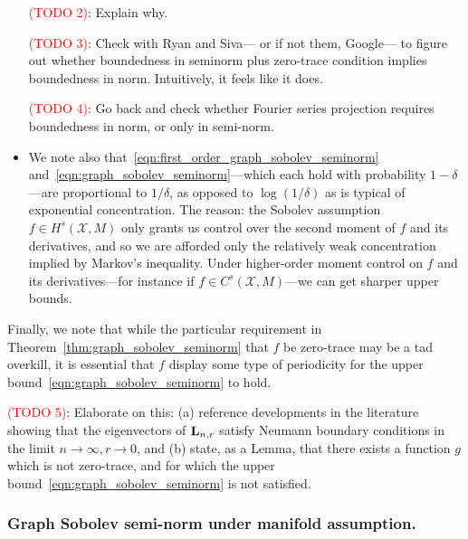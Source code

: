 \documentclass{article}
\newcommand{\1}{\mathbf{1}}
\newcommand{\Lap}{{\bf L}}
\newcommand{\Xset}{\mathcal{X}}
\theoremstyle{alden}
\theoremstyle{aldenthm}
\theoremstyle{definition}
\theoremstyle{remark}
\begin{document}
\begin{itemize}
	\textcolor{red}{(TODO 2)}: Explain why.
	
	\textcolor{red}{(TODO 3)}: Check with Ryan and Siva--- or if not them, Google--- to figure out whether boundedness in seminorm plus zero-trace condition implies boundedness in norm. Intuitively, it feels like it does.
	
	\textcolor{red}{(TODO 4)}: Go back and check whether Fourier series projection requires boundedness in norm, or only in semi-norm.
	\item We note also that~\eqref{eqn:first_order_graph_sobolev_seminorm} and~\eqref{eqn:graph_sobolev_seminorm}---which each hold with probability $1 - \delta$---are proportional to $1/\delta$, as opposed to $\log(1/\delta)$ as is typical of exponential concentration. The reason: the Sobolev assumption $f \in H^s(\Xset,M)$ only grants us control over the second moment of $f$ and its derivatives, and so we are afforded only the relatively weak concentration implied by Markov's inequality. Under higher-order moment control on $f$ and its derivatives---for instance if $f \in C^s(\Xset,M)$---we can get sharper upper bounds.
\end{itemize}

Finally, we note that while the particular requirement in Theorem~\ref{thm:graph_sobolev_seminorm} that $f$ be zero-trace may be a tad overkill, it is essential that $f$ display some type of periodicity for the upper bound~\eqref{eqn:graph_sobolev_seminorm} to hold.

\textcolor{red}{(TODO 5)}: Elaborate on this: (a) reference developments in the literature showing that the eigenvectors of $\Lap_{n,r}$ satisfy Neumann boundary conditions in the limit $n \to \infty, r \to 0$, and (b) state, as a Lemma, that there exists a function $g$ which is not zero-trace, and for which the upper bound~\eqref{eqn:graph_sobolev_seminorm} is not satisfied.

\subsubsection{Graph Sobolev semi-norm under manifold assumption.}
\end{document}
